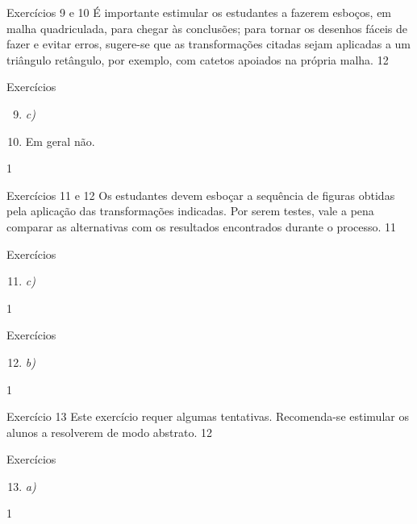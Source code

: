 \begin{sugestions}{Exercícios 9 e 10}
{
É importante estimular os estudantes a fazerem esboços, em malha quadriculada, para chegar às conclusões; para tornar os desenhos fáceis de fazer e evitar erros, sugere-se que as transformações citadas sejam aplicadas a um triângulo retângulo, por exemplo, com catetos apoiados na própria malha.
}{1}{2}
\end{sugestions}
\begin{answer}{Exercícios}
{\exerciselist
\begin{enumerate}\setcounter{enumi}{8}
\item \textit{c)}

\item Em geral não.
\end{enumerate}
}{1}
\end{answer}
\clearmargin
\begin{sugestions}{Exercícios 11 e 12}
{
Os estudantes devem esboçar a sequência de figuras obtidas pela aplicação das transformações indicadas. Por serem testes, vale a pena comparar as alternativas com os resultados encontrados durante o processo. 
}{1}{1}
\end{sugestions}
\begin{answer}{Exercícios}
{\exerciselist
\begin{enumerate}\setcounter{enumi}{10}
\item \textit{c)}
\end{enumerate}
}{1}
\end{answer}
\clearmargin

\begin{answer}{Exercícios}
{\exerciselist
\begin{enumerate}\setcounter{enumi}{11}
\item \textit{b)}
\end{enumerate}
}{1}
\end{answer}
\begin{sugestions}{Exercício 13}
{
Este exercício requer algumas tentativas. Recomenda-se estimular os alunos a resolverem de modo abstrato.
}{1}{2}
\end{sugestions}
\begin{answer}{Exercícios}
{\exerciselist
\begin{enumerate}\setcounter{enumi}{12}
\item \textit{a)}
\end{enumerate}
}{1}
\end{answer}
\clearmargin

